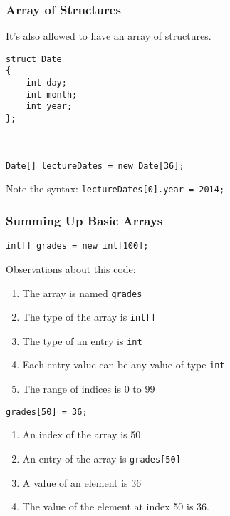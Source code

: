 \begin{frame}[fragile]
\frametitle{Array of Structures}
It's also allowed to have an array of structures.

\begin{verbatim}
struct Date
{
    int day;
    int month;
    int year;
};



Date[] lectureDates = new Date[36];
\end{verbatim}

Note the syntax: \texttt{lectureDates[0].year = 2014;}

\end{frame}



\begin{frame}

\frametitle{Summing Up Basic Arrays}

\texttt{int[] grades = new int[100];}

Observations about this code:
\begin{enumerate}
\item The array is named \texttt{grades}
\item The type of the array is \texttt{int[]}
\item The type of an entry is \texttt{int}
\item Each entry value can be any value of type \texttt{int}
\item The range of indices is 0 to 99
\setcounter{tmpc}{\theenumi}
\end{enumerate}

\texttt{grades[50] = 36;}

\begin{enumerate}
\setcounter{enumi}{\thetmpc}
\item An index of the array is 50
\item An entry of the array is \texttt{grades[50]}
\item A value of an element is 36
\item The value of the element at index 50 is 36.
\end{enumerate}

\end{frame}




